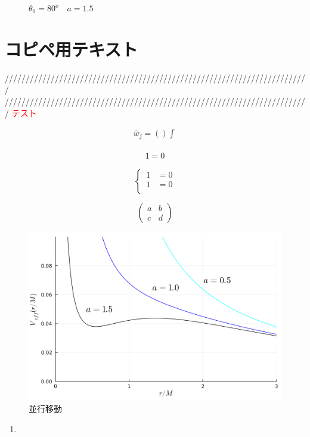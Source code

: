 \documentclass[dvipdfmx]{report} %
\begin{document}
\begin{figure}[H]
\begin{minipage}{0.49\textwidth}
        \caption{$\theta_{0}=80^{o} \quad a=1.5$}
        \label{}
    \end{minipage}
\end{figure}




\chapter{コピペ用テキスト}
/////////////////////////////////////////////////////////////////////////\\
/////////////////////////////////////////////////////////////////////////
\textcolor{red}{テスト}

\begin{equation*}
\begin{split}
	\bar{w}_j = \left( \right) \int^{}_{}
\end{split}
\end{equation*}

\begin{tcolorbox}[title=メモ用]
\begin{eqnarray*}
	1 = 0
\end{eqnarray*}
\end{tcolorbox}

\begin{equation}
\left\{ \,
\begin{aligned}
	1 &= 0\\
	1 &= 0\\
\end{aligned}
\right.
\end{equation}

\[
\left(
\begin{matrix}
a & b \\
c & d
\end{matrix}
\right)
\]


\begin{figure}[H]
    \centering
    \includegraphics[width=0.5\columnwidth]{./images/buch/v-eff.png}
    \caption{並行移動}
    \label{}
\end{figure}

\begin{enumerate}[(1)\,]
\item{}
\end{enumerate}
\end{document}
